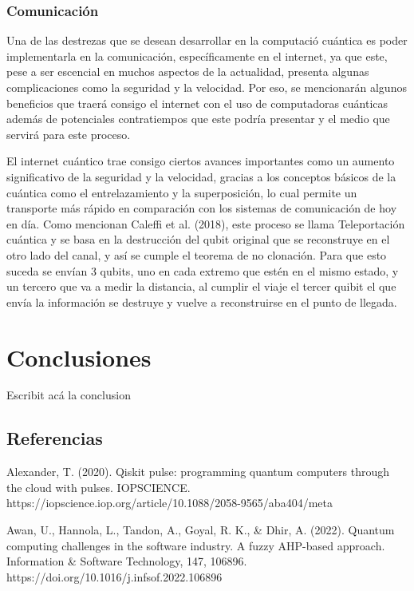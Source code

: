 \documentclass{article}
\begin{document}
\subsubsection{Comunicación}
Una de las destrezas que se desean desarrollar en la computació cuántica es poder implementarla en la comunicación, específicamente en el internet, ya que este, pese a ser escencial en muchos aspectos de la actualidad, presenta algunas complicaciones como la seguridad y la velocidad. Por eso, se mencionarán algunos beneficios que traerá consigo el internet con el uso de computadoras cuánticas además de potenciales contratiempos que este podría presentar y el medio que servirá para este proceso.

El internet cuántico trae consigo ciertos avances importantes como un aumento significativo de la seguridad y la velocidad, gracias a los conceptos básicos de la cuántica como el entrelazamiento y la superposición, lo cual permite un transporte más rápido en comparación con los sistemas de comunicación de hoy en día. Como mencionan Caleffi et al. (2018), este proceso se llama Teleportación cuántica y se basa en la destrucción del qubit original que se reconstruye en el otro lado del canal, y así se cumple el teorema de no clonación. Para que esto suceda se envían 3 qubits, uno en cada extremo que estén en el mismo estado, y un tercero que va a medir la distancia, al cumplir el viaje el tercer quibit el que envía la información se destruye y vuelve a reconstruirse en el punto de llegada. 


\newpage
\section{Conclusiones}
Escribit acá la conclusion



\clearpage

\subsection{Referencias}
Alexander, T. (2020). Qiskit pulse: programming quantum computers through the cloud with pulses. IOPSCIENCE. https://iopscience.iop.org/article/10.1088/2058-9565/aba404/meta

Awan, U., Hannola, L., Tandon, A., Goyal, R. K., & Dhir, A. (2022). Quantum computing challenges in the software industry. A fuzzy AHP-based approach. Information & Software Technology, 147, 106896. https://doi.org/10.1016/j.infsof.2022.106896
\end{document}
